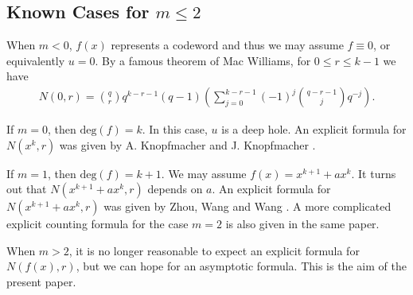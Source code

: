\documentclass[reqno]{amsart}
\theoremstyle{remark}
\numberwithin{equation}{section}
\begin{document}
\subsection{Known Cases for $m\leq 2$}

When $m<0$, $f(x)$ represents a codeword and thus we may assume $f\equiv 0$,  or equivalently $u=0$.  By a famous theorem of Mac Williams,
 for $0\leq r\leq k-1$ we have
    \begin{align*}
 N(0, r)%
 ={q \choose r}q^{k-r-1}(q-1)\left(\sum_{j=0}^{k-r-1}(-1)^j {q-r-1 \choose j}q^{-j}\right).
    \end{align*}


If {\bf $m=0$}, then $\text{deg}(f)=k$. In this case, $u$ is a deep hole. An explicit formula for  $N(x^k, r)$ was given by A. Knopfmacher and J. Knopfmacher \cite{KK}.
%

 If {\bf $m=1$}, then $\text{deg}(f)=k+1$. We may assume $f(x)=x^{k+1}+ax^k$.  It turns out that $N(x^{k+1}+ax^k, r)$ depends on $a$. An explicit formula
 for $N(x^{k+1}+ax^k, r)$ was given by Zhou, Wang and Wang \cite{ZWW}.
A  more complicated explicit counting formula for the case {\bf $m=2$} is also given in the same paper.


When $m>2$, it is no longer reasonable to expect an explicit formula for $N(f(x), r)$,
but we can hope for an asymptotic formula. This is the aim of the present paper.
\end{document}
